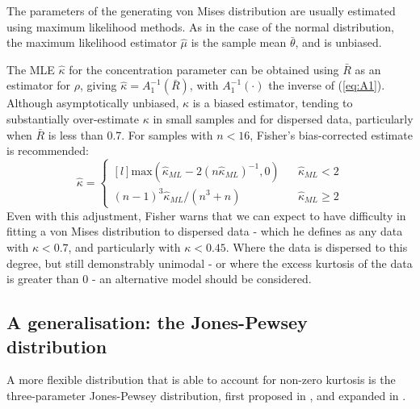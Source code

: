\documentclass[../../ArchStats.tex]{subfiles}
\begin{document}
The parameters of the generating von Mises distribution are usually estimated using maximum likelihood methods. As in the case of the normal distribution, the maximum likelihood estimator $\hat{\mu}$ is the sample mean $\bar{\theta}$, and is unbiased.

The MLE $\hat{\kappa}$ for the concentration parameter can be obtained using $\bar{R}$ as an estimator for $\rho$, giving $\hat{\kappa} = A_1^{-1}(\bar{R})$, with $A_1^{-1}(\cdot)$ the inverse of (\ref{eq:A1}). Although asymptotically unbiased, $\hat{\kappa}$ is a biased estimator, tending to substantially over-estimate $\kappa$ in small samples and for dispersed data, particularly when $\bar{R}$ is less than 0.7. For samples with $n < 16$, Fisher's bias-corrected estimate \cite{Fisher1993} is recommended:
	\begin{equation}
	\hat{\kappa} = \left\lbrace \begin{matrix*}[l]
	\text{max} ( \hat{\kappa}_{ML} - 2(n \hat{\kappa}_{ML})^{-1}, 0) & & \hat{\kappa}_{ML} < 2 \\
	(n-1)^3 \hat{\kappa}_{ML} / (n^3 + n) & &  \hat{\kappa}_{ML} \geq 2
	\end{matrix*} \right. 
	\end{equation}
Even with this adjustment, Fisher warns that we can expect to have difficulty in fitting a von Mises distribution to dispersed data -  which he defines as any data with $\kappa < 0.7$, and particularly with $\kappa < 0.45$. Where the data is dispersed to this degree, but still demonstrably unimodal - or where the excess kurtosis of the data is greater than 0 - an alternative model should be considered.



\subsection{A generalisation: the Jones-Pewsey distribution}
\label{sec:Jones-Pewsey}
A more flexible distribution that is able to account for non-zero kurtosis is the three-parameter Jones-Pewsey distribution, first proposed in \cite{Jones2005}, and expanded in \cite{Pewsey2014}.
\end{document}
